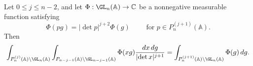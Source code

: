 \begin{lemma}\label{lem:sub-gln:quotient-composition}
  Let $0 \leq j \leq n - 2$, and let $\Phi : \GL_n(\mathbb{A}) \rightarrow \mathbb{C}$ be a nonnegative measurable function satisfying
  \begin{equation*}
    \Phi(p g) = \lvert \det p \rvert^{j + 2} \Phi(g)
    \qquad
    \text{ for } p \in P_n^{(j + 1)}(\mathbb{A}).
  \end{equation*}
  Then
  \begin{equation}\label{eq:cumiu83k5d}
    \int_{P_n^{(j)}(\mathbb{A}) \backslash \GL_n(\mathbb{A})}
    \int_{P_{n - j - 1}(\mathbb{A}) \backslash \GL_{n - j - 1}(\mathbb{A})}
    \Phi(x g)
    \frac{d x \, d g}{\lvert \det x \rvert^{j + 1}}
    =
    \int_{P_n^{(j + 1)}(\mathbb{A}) \backslash \GL_n(\mathbb{A})}
    \Phi(g)\, d g.
  \end{equation}
\end{lemma}
